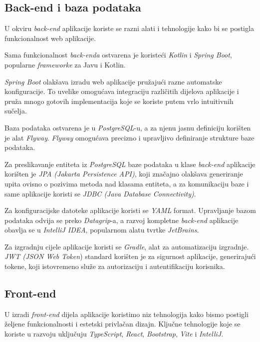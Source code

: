 		
		\subsection{Back-end i baza podataka}
		U okviru \textit{back-end} aplikacije koriste se razni alati i tehnologije kako bi se postigla funkcionalnost web aplikacije. 
		
		Sama funkcionalnost \textit{back-enda} ostvarena je koristeći \textit{Kotlin} i \textit{Spring Boot}, popularne \textit{frameworke} za Javu i Kotlin.
		
		\textit{Spring Boot} olakšava izradu web aplikacije pružajući razne automatske konfiguracije. To uvelike omogućava integraciju različitih dijelova aplikacije i pruža mnogo gotovih implementacija koje se koriste putem vrlo intuitivnih sučelja.
		
		Baza podataka ostvarena je u \textit{PostgreSQL}-u, a za njenu jasnu definiciju korišten je alat \textit{Flyway}. \textit{Flyway} omogućava precizno i upravljivo definiranje strukture baze podataka.
		
		Za preslikavanje entiteta iz \textit{PostgreSQL} baze podataka u klase \textit{back-end} aplikacije korišten je \textit{JPA (Jakarta Persistence API)}, koji značajno olakšava generiranje upita ovisno o pozivima metoda nad klasama entiteta, a za komunikaciju baze i same aplikacije koristi se \textit{JDBC (Java Database Connectivity)}.
		
		Za konfiguracijske datoteke aplikacije koristi se \textit{YAML} format. Upravljanje bazom podataka odvija se preko \textit{Datagrip}-a, a razvoj kompletne \textit{back-end} aplikacije obavlja se u \textit{IntelliJ IDEA}, popularnom alatu tvrtke \textit{JetBrains}. 
		
		Za izgradnju cijele aplikacije koristi se \textit{Gradle}, alat za automatizaciju izgradnje. 
\textit{JWT (JSON Web Token}) standard korišten je za sigurnost aplikacije, generirajući tokene, koji istovremeno služe za autorizaciju i autentifikaciju korisnika.


			\subsection{Front-end}
			U izradi \textit{front-end} dijela aplikacije koristimo niz tehnologija kako bismo postigli željene funkcionalnosti i estetski privlačan dizajn. Ključne tehnologije koje se koriste u razvoju uključuju \textit{TypeScript}, \textit{React}, \textit{Bootstrap}, \textit{Vite} i \textit{IntelliJ}.
			
